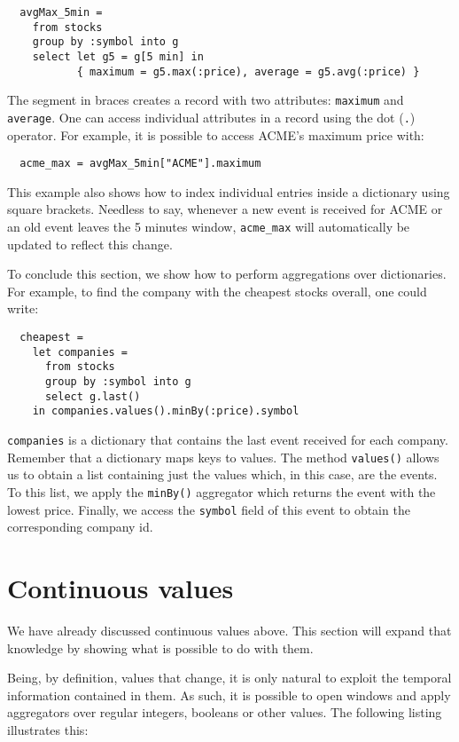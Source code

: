\documentclass[a4,11pt]{report}
\begin{document}
\begin{lstlisting}
  avgMax_5min =
    from stocks
    group by :symbol into g
    select let g5 = g[5 min] in
           { maximum = g5.max(:price), average = g5.avg(:price) }
\end{lstlisting}

The segment in braces creates a record with two attributes:
\verb=maximum= and \verb=average=. One can access individual
attributes in a record using the dot (\verb=.=) operator. For example,
it is possible to access ACME's maximum price with:

\begin{lstlisting}
  acme_max = avgMax_5min["ACME"].maximum
\end{lstlisting}

This example also shows how to index individual entries inside a
dictionary using square brackets. Needless to say, whenever a new
event is received for ACME or an old event leaves the 5 minutes
window, \verb=acme_max= will automatically be updated to reflect this
change.

To conclude this section, we show how to perform aggregations over
dictionaries. For example, to find the company with the cheapest
stocks overall, one could write:

\begin{lstlisting}
  cheapest =
    let companies =
      from stocks
      group by :symbol into g
      select g.last()
    in companies.values().minBy(:price).symbol
\end{lstlisting}

\verb=companies= is a dictionary that contains the last event received
for each company. Remember that a dictionary maps keys to values. The
method \verb=values()= allows us to obtain a list containing just the
values which, in this case, are the events. To this list, we apply the
\verb=minBy()= aggregator which returns the event with the lowest
price. Finally, we access the \verb=symbol= field of this event to
obtain the corresponding company id.

\section{Continuous values}

We have already discussed continuous values above. This section will
expand that knowledge by showing what is possible to do with them.

Being, by definition, values that change, it is only natural to
exploit the temporal information contained in them. As such, it is
possible to open windows and apply aggregators over regular integers,
booleans or other values. The following listing illustrates this:
\end{document}
